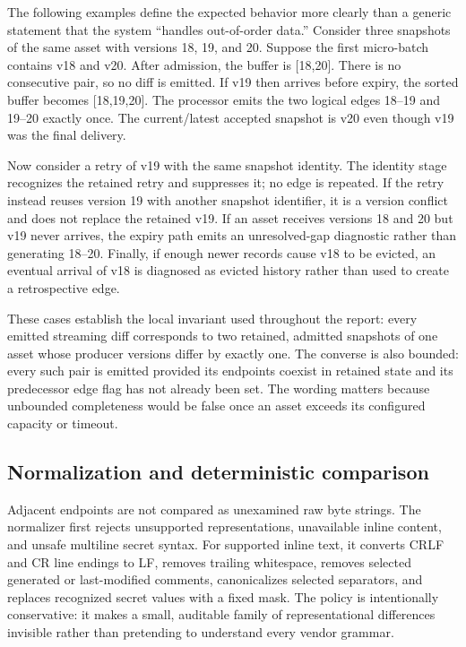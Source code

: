 The following examples define the expected behavior more clearly than a generic statement that the system ``handles out-of-order data.'' Consider three snapshots of the same asset with versions 18, 19, and 20. Suppose the first micro-batch contains v18 and v20. After admission, the buffer is [18,20]. There is no consecutive pair, so no diff is emitted. If v19 then arrives before expiry, the sorted buffer becomes [18,19,20]. The processor emits the two logical edges 18--19 and 19--20 exactly once. The current/latest accepted snapshot is v20 even though v19 was the final delivery.

Now consider a retry of v19 with the same snapshot identity. The identity stage recognizes the retained retry and suppresses it; no edge is repeated. If the retry instead reuses version 19 with another snapshot identifier, it is a version conflict and does not replace the retained v19. If an asset receives versions 18 and 20 but v19 never arrives, the expiry path emits an unresolved-gap diagnostic rather than generating 18--20. Finally, if enough newer records cause v18 to be evicted, an eventual arrival of v18 is diagnosed as evicted history rather than used to create a retrospective edge.

These cases establish the local invariant used throughout the report: every emitted streaming diff corresponds to two retained, admitted snapshots of one asset whose producer versions differ by exactly one. The converse is also bounded: every such pair is emitted provided its endpoints coexist in retained state and its predecessor edge flag has not already been set. The wording matters because unbounded completeness would be false once an asset exceeds its configured capacity or timeout.

\subsection{Normalization and deterministic comparison}

Adjacent endpoints are not compared as unexamined raw byte strings. The normalizer first rejects unsupported representations, unavailable inline content, and unsafe multiline secret syntax. For supported inline text, it converts CRLF and CR line endings to LF, removes trailing whitespace, removes selected generated or last-modified comments, canonicalizes selected separators, and replaces recognized secret values with a fixed mask. The policy is intentionally conservative: it makes a small, auditable family of representational differences invisible rather than pretending to understand every vendor grammar.

